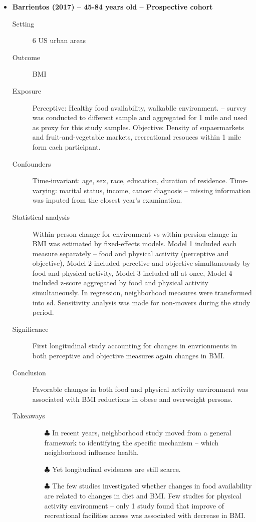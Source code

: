 \documentclass{article}
\begin{document}
\begin{itemize}
    \item {\bf Barrientos (2017)  -- 45-84 years old -- Prospective cohort}
		\begin{description}
			\item[Setting] 6 US urban areas
			\item[Outcome] BMI
			\item[Exposure] Perceptive: Healthy food availability, walkablle environment. -- survey was conducted to different sample and aggregated for 1 mile and used as proxy for this study samples. Objective: Density of supaermarkets and fruit-and-vegetable markets, recreational resouces within 1 mile form each participant.
			\item[Confounders] Time-invariant: age, sex, race, education, duration of residence. Time-varying: marital status, income, cancer diagnosis -- missing information was inputed from the closest year's examination.  
			\item[Statistical analysis] Within-person change for environment vs within-persion change in BMI was estimated by fixed-effects models. Model 1 included each measure separately -- food and physical activity (perceptive and objective), Model 2 included  percetive and objective simultaneously by food and physical activity, Model 3 included all at once, Model 4 included z-score aggregated by food and physical activity simultaneously. In regression, neighborhood measures were transformed into sd. Sensitivity analysis was made for non-movers during the study period.
    			\item[Significance] First longitudinal study accounting for changes in envrionments in both perceptive and objective measures again changes in BMI. 
    			\item[Conclusion] Favorable changes in both food and physical activity environment  was associated with BMI reductions in obese and overweight persons.
    			\item[Takeaways] \mbox{}\par
    				\begin{itemize}
    					\item[$\clubsuit$] In recent years, neighborhood study moved from a general framework to identifying the specific mechanism -- which neighborhood influence health.
    					\item[$\clubsuit$] Yet longitudinal evidences are still scarce.
    					\item[$\clubsuit$] The few studies investigated whether changes in food availability are related to changes in diet and BMI. Few studies for physical activity environment -- only 1 study found that improve of recreational facilities access was associated with decrease in BMI. 
				\end{itemize}
    		\end{description}


\end{itemize}
\end{document}
